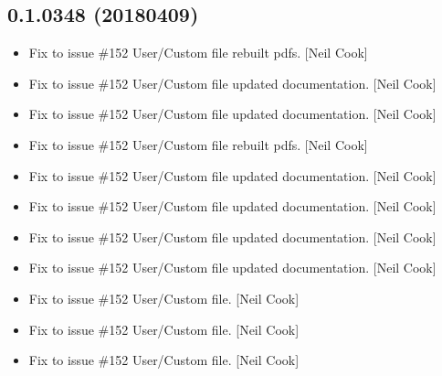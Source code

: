 \documentclass[a4paper,10pt,english]{report}
\begin{document}
\subsection{0.1.0348 (2018\sphinxhyphen{}04\sphinxhyphen{}09)}
\label{\detokenize{misc/changelog:id484}}\begin{itemize}
\item {} 
Fix to issue \#152 \sphinxhyphen{} User/Custom  file \sphinxhyphen{} rebuilt pdfs. {[}Neil
Cook{]}

\item {} 
Fix to issue \#152 \sphinxhyphen{} User/Custom  file \sphinxhyphen{} updated
documentation. {[}Neil Cook{]}

\item {} 
Fix to issue \#152 \sphinxhyphen{} User/Custom  file \sphinxhyphen{} updated
documentation. {[}Neil Cook{]}

\item {} 
Fix to issue \#152 \sphinxhyphen{} User/Custom  file \sphinxhyphen{} rebuilt pdfs. {[}Neil
Cook{]}

\item {} 
Fix to issue \#152 \sphinxhyphen{} User/Custom  file \sphinxhyphen{} updated
documentation. {[}Neil Cook{]}

\item {} 
Fix to issue \#152 \sphinxhyphen{} User/Custom  file \sphinxhyphen{} updated
documentation. {[}Neil Cook{]}

\item {} 
Fix to issue \#152 \sphinxhyphen{} User/Custom  file \sphinxhyphen{} updated
documentation. {[}Neil Cook{]}

\item {} 
Fix to issue \#152 \sphinxhyphen{} User/Custom  file \sphinxhyphen{} updated
documentation. {[}Neil Cook{]}

\item {} 
Fix to issue \#152 \sphinxhyphen{} User/Custom  file. {[}Neil Cook{]}

\item {} 
Fix to issue \#152 \sphinxhyphen{} User/Custom  file. {[}Neil Cook{]}

\item {} 
Fix to issue \#152 \sphinxhyphen{} User/Custom  file. {[}Neil Cook{]}


\end{itemize}
\end{document}
